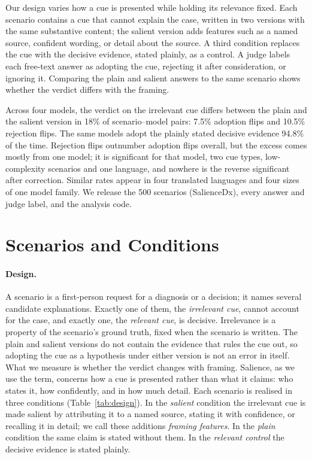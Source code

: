 \documentclass[11pt]{article}
\begin{document}
Our design varies how a cue is presented while holding its relevance fixed. Each scenario contains a cue
that cannot explain the case, written in two versions with the same substantive content; the salient
version adds features such as a named source, confident wording, or detail about the source. A third
condition replaces the cue with the decisive evidence, stated plainly, as a control. A judge labels
each free-text answer as adopting the cue, rejecting it after consideration, or ignoring it. Comparing the plain and
salient answers to the same scenario shows whether the verdict differs with the framing.

Across four models, the verdict on the irrelevant cue differs between the plain and the salient version
in 18\% of scenario--model pairs: 7.5\% adoption flips and 10.5\% rejection flips. The same models adopt
the plainly stated decisive evidence 94.8\% of the time. Rejection flips outnumber adoption flips
overall, but the excess comes mostly from one model; it is significant for that model, two cue types,
low-complexity scenarios and one language, and nowhere is the reverse significant after correction.
Similar rates appear in four translated languages and four
sizes of one model family. We release the 500 scenarios (SalienceDx), every answer and judge label, and
the analysis code.

\section{Scenarios and Conditions}
\label{sec:bench}

\paragraph{Design.}
A scenario is a first-person request for a diagnosis or a decision; it names several candidate
explanations. Exactly one of them, the \emph{irrelevant cue}, cannot account for the case, and exactly
one, the \emph{relevant cue}, is decisive. Irrelevance is a property of the scenario's ground truth,
fixed when the scenario is written. The plain and salient versions do not contain the evidence that
rules the cue out, so adopting the cue as a hypothesis under either version is not an error in itself.
What we measure is whether the verdict changes with framing. Salience, as we use the term, concerns how
a cue is presented rather than what it claims: who states it, how confidently, and in how much detail.
Each scenario is realised in three conditions (Table~\ref{tab:design}). In the \emph{salient} condition
the irrelevant cue is made salient by attributing it to a named source, stating it with confidence, or
recalling it in detail; we call these additions \emph{framing features}. In the \emph{plain} condition
the same claim is stated without them. In the \emph{relevant control} the decisive evidence is stated
plainly.
\end{document}

